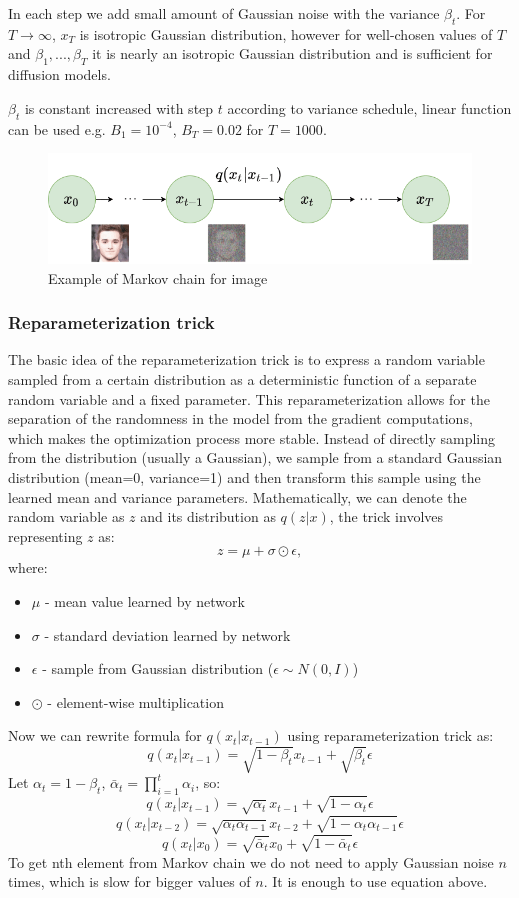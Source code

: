 \documentclass[11pt,a4paper]{report}
\begin{document}
In each step we add small amount of Gaussian noise with the variance $\beta_t$. For $T\rightarrow\infty$, $x_T$ is isotropic Gaussian distribution, however for well-chosen values of $T$ and $\beta_1,..., \beta_T$ it is nearly an isotropic Gaussian distribution and is sufficient for diffusion models.

$\beta_t$ is constant increased with step $t$ according to variance schedule, linear function can be used e.g. $B_1=10^{-4}$, $B_T=0.02$ for $T=1000$. \cite{DDPM}

\begin{figure}[H]
	\centering
	\includegraphics[width=\textwidth]{images/forward-diffusion}
    \caption{Example of Markov chain for image \cite{DDPM}}
\end{figure}

\subsubsection{Reparameterization trick}
The basic idea of the reparameterization trick is to express a random variable sampled from a certain distribution as a deterministic function of a separate random variable and a fixed parameter. This reparameterization allows for the separation of the randomness in the model from the gradient computations, which makes the optimization process more stable. Instead of directly sampling from the distribution (usually a Gaussian), we sample from a standard Gaussian distribution (mean=0, variance=1) and then transform this sample using the learned mean and variance parameters. 
Mathematically, we can denote the random variable as $z$ and its distribution as $q(z|x)$, the trick involves representing $z$ as:
\[z=\mu + \sigma \odot \epsilon,\]
where:
\begin{itemize}
\item $\mu$ - mean value learned by network 
\item $\sigma$ - standard deviation learned by network 
\item $\epsilon$ - sample from Gaussian distribution ($\epsilon \sim N(0,I)$)
\item $\odot$ - element-wise multiplication
\end{itemize}
Now we can rewrite formula for $q(x_t|x_{t-1})$ using reparameterization trick as:
\[q(x_t|x_{t-1}) = \sqrt{1 - \beta_t}x_{t-1} + \sqrt{\beta_t}\epsilon\]
Let $\alpha_t = 1 - \beta_t$, $\bar{\alpha}_t = \prod_{i=1}^{t}{\alpha_i}$, so:
\[q(x_t|x_{t-1}) = \sqrt{\alpha_t}x_{t-1} + \sqrt{1-\alpha_{t}}\epsilon\]
\[q(x_t|x_{t-2}) = \sqrt{\alpha_t \alpha_{t-1}}x_{t-2} + \sqrt{1-\alpha_t \alpha_{t-1}}\epsilon\]
\[q(x_t|x_0) = \sqrt{\bar{\alpha}_t}x_0 + \sqrt{1-\bar{\alpha}_t}\epsilon\]
To get nth element from Markov chain we do not need to apply Gaussian noise $n$ times, which is slow for bigger values of $n$. It is enough to use equation above. \cite{lw_diffusion}
\end{document}
